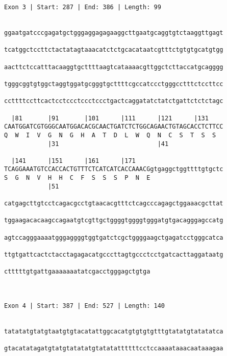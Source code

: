 \documentclass{article}
\begin{document}
\begin{Verbatim}
Exon 3 | Start: 287 | End: 386 | Length: 99


ggaatgatcccgagatgctgggaggagagaaggcttgaatgcaggtgtctaaggttgagt
                                                            
tcatggctccttctactatagtaaacatctctgcacataatcgtttctgtgtgcatgtgg
                                                            
aacttctccatttacaaggtgcttttaagtcataaaacgttggctcttaccatgcagggg
                                                            
tgggcggtgtggctaggtggatgcgggtgcttttcgccatccctgggcctttctccttcc
                                                            
ccttttccttcactcctccctccctccctgactcaggatatctatctgattctctctagc
                                                            
  |81       |91       |101      |111      |121      |131    
CAATGGATCGTGGGCAATGGACACGCAACTGATCTCTGGCAGAACTGTAGCACCTCTTCC
Q  W  I  V  G  N  G  H  A  T  D  L  W  Q  N  C  S  T  S  S  
            |31                           |41               
  
  |141      |151      |161      |171                        
TCAGGAAATGTCCACCACTGTTTCTCATCATCACCAAACGgtgaggctggttttgtgctc
S  G  N  V  H  H  C  F  S  S  S  P  N  E                    
            |51                                             
  
catgagcttgtcctcagacgcctgtaacacgtttctcagcccagagctggaaacgcttat
                                                            
tggaagacacaagccagaatgtcgttgctggggtggggtgggatgtgacagggagccatg
                                                            
agtccagggaaaatgggaggggtggtgatctcgctggggaagctgagatcctgggcatca
                                                            
ttgtgattcactctacctagagacatgcccttagtgccctcctgatcacttaggataatg
                                                            
ctttttgtgattgaaaaaaatatcgacctgggagctgtga
                                        
                                        
 
Exon 4 | Start: 387 | End: 527 | Length: 140


tatatatgtatgtaatgtgtacatattggcacatgtgtgtgtttgtatatgtatatatca
                                                            
gtacatatagatgtatgtatatatgtatatattttttcctccaaaataaacaataaagaa
                                                            

\end{Verbatim}
\end{document}
